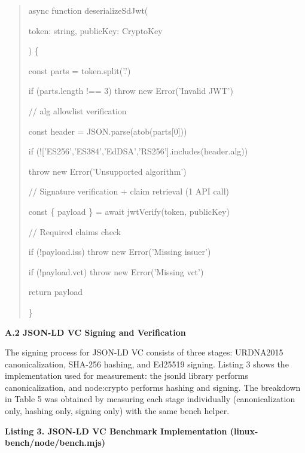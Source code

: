 \begin{quote}
async function deserializeSdJwt(

token: string, publicKey: CryptoKey

) \{

const parts = token.split('.')

if (parts.length !== 3) throw new Error('Invalid JWT')

// alg allowlist verification

const header = JSON.parse(atob(parts{[}0{]}))

if (!{[}'ES256','ES384','EdDSA','RS256'{]}.includes(header.alg))

throw new Error('Unsupported algorithm')

// Signature verification + claim retrieval (1 API call)

const \{ payload \} = await jwtVerify(token, publicKey)

// Required claims check

if (!payload.iss) throw new Error('Missing issuer')

if (!payload.vct) throw new Error('Missing vct')

return payload

\}
\end{quote}

\textbf{A.2 JSON-LD VC Signing and Verification}

The signing process for JSON-LD VC consists of three stages: URDNA2015 canonicalization, SHA-256 hashing, and Ed25519 signing. Listing 3 shows the implementation used for measurement: the jsonld library performs canonicalization, and node:crypto performs hashing and signing. The breakdown in Table 5 was obtained by measuring each stage individually (canonicalization only, hashing only, signing only) with the same bench helper.

\textbf{Listing 3. JSON-LD VC Benchmark Implementation (linux-bench/node/bench.mjs)}

